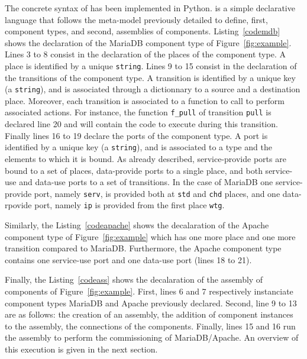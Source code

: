 The concrete syntax of \mad has been implemented in Python. \mad
is a simple declarative language that follows the meta-model
previously detailed to define, first, component types, and second,
assemblies of components. Listing~\ref{codemdb} shows the declaration
of the MariaDB component type of Figure~\ref{fig:example}. Lines 3 to
8 consist in the declaration of the places of the component type. A
place is identified by a unique \texttt{string}. Lines 9 to 15 consist
in the declaration of the transitions of the component type. A
transition is identified by a unique key (a \texttt{string}), and is
associated through a dictionnary to a source and a destination
place. Moreover, each transition is associated to a function to call
to perform associated actions. For instance, the function
\texttt{f\_pull} of transition \texttt{pull} is declared line 20 and
will contain the code to execute during this transition. Finally lines
16 to 19 declare the ports of the component type. A port is identified
by a unique key (a \texttt{string}), and is associated to a type and
the elements to which it is bound. As already described,
service-provide ports are bound to a set of places, data-provide ports
to a single place, and both service-use and data-use ports to a set of
transitions. In the case of MariaDB one service-provide port, namely
\texttt{serv}, is provided both at \texttt{std} and \texttt{chd}
places, and one data-rpovide port, namely \texttt{ip} is provided from
the first place \texttt{wtg}.



Similarly, the Listing~\ref{codeapache} shows the decalaration of the
Apache component type of Figure~\ref{fig:example} which has one more place
and one more transition compared to MariaDB. Furthermore, the Apache
component type contains one service-use port and one data-use port
(lines 18 to 21).



Finally, the Listing~\ref{codeass} shows the decalaration of the
assembly of components of Figure~\ref{fig:example}. First, lines 6 and
7 respectively instanciate component types MariaDB and Apache
previously declared. Second, line 9 to 13 are as follows: the creation
of an assembly, the addition of component instances to the assembly,
the connections of the components. Finally, lines 15 and 16 run the
assembly to perform the commissioning of MariaDB/Apache. An overview
of this execution is given in the next section.



